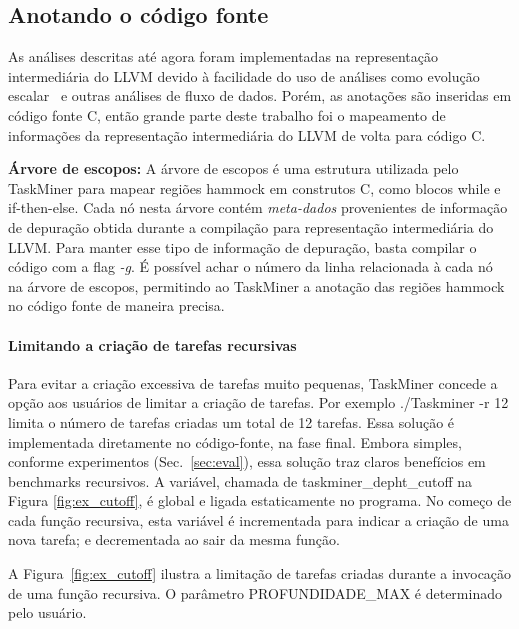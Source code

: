 \documentclass[sigplan,10pt,review]{acmart}
\newcommand\Taskminer{\mbox{\textsf{TaskMiner}}}
\begin{document}
\subsection{Anotando o código fonte}
\label{sub:ir}

As análises descritas até agora foram implementadas na representação intermediária
do LLVM devido à facilidade do uso de análises como evolução escalar~\cite[p.18]{Grosser12} e outras
análises de fluxo de dados.
Porém, as anotações são inseridas em código fonte C, então grande
parte deste trabalho foi o mapeamento de informações da representação intermediária do LLVM de volta
para código C.

\noindent
\textbf{Árvore de escopos:}
A árvore de escopos é uma estrutura utilizada pelo {\Taskminer} para mapear regiões hammock em construtos C, como blocos
\textsf{while} e \textsf{if-then-else}. Cada nó nesta árvore contém {\em meta-dados}
provenientes de informação de depuração obtida durante a compilação para representação
intermediária do LLVM. Para manter esse tipo de informação de depuração, basta compilar o código com a flag
{\em -g}.
É possível achar o número da linha relacionada à cada nó na árvore de escopos, permitindo
ao {\Taskminer} a anotação das regiões hammock no código fonte de maneira precisa.

\paragraph{Limitando a criação de tarefas recursivas}
Para evitar a criação excessiva de tarefas muito pequenas, {\Taskminer} concede a opção
aos usuários de limitar a criação de tarefas. Por exemplo \textsf{./Taskminer -r 12} limita o número
de tarefas criadas um total de 12 tarefas. Essa solução é implementada diretamente no código-fonte,
na fase final. Embora simples, conforme experimentos (Sec.~\ref{sec:eval}), essa solução traz claros
benefícios em benchmarks recursivos. A variável, chamada de \textsf{taskminer\_depht\_cutoff} na Figura
\ref{fig:ex_cutoff}, é global e ligada estaticamente no programa. No começo de cada função recursiva,
esta variável é incrementada para indicar a criação de uma nova tarefa; e decrementada ao sair da mesma função.

\begin{example}
A Figura~\ref{fig:ex_cutoff} ilustra a limitação de tarefas criadas durante a invocação de uma
função recursiva.
O parâmetro \textsf{PROFUNDIDADE\_MAX} é determinado pelo usuário.
\end{example}
\end{document}
